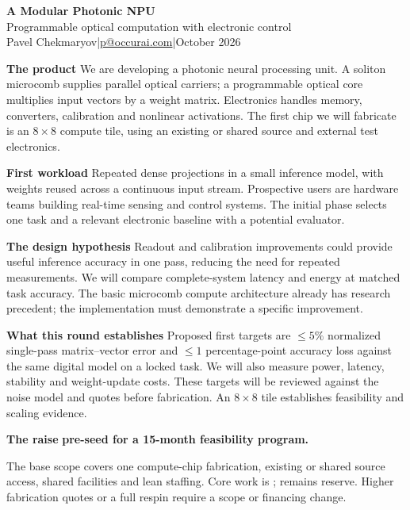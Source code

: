 \documentclass[10pt]{article}
\newcommand{\labelled}[1]{\textbf{\color{accent}#1}\quad}
\begin{document}
\raggedright
{\LARGE\bfseries\color{ink} A Modular Photonic NPU}\\[3pt]
{\large Programmable optical computation with electronic control}\\
Pavel Chekmaryov\quad|\quad\href{mailto:p@occurai.com}{p@occurai.com}\quad|\quad October 2026

\labelled{The product}
We are developing a photonic neural processing unit. A soliton microcomb supplies parallel optical carriers; a programmable optical core multiplies input vectors by a weight matrix. Electronics handles memory, converters, calibration and nonlinear activations. The first chip we will fabricate is an \(8\times8\) compute tile, using an existing or shared source and external test electronics.

\labelled{First workload}
Repeated dense projections in a small inference model, with weights reused across a continuous input stream. Prospective users are hardware teams building real-time sensing and control systems. The initial phase selects one task and a relevant electronic baseline with a potential evaluator.

\labelled{The design hypothesis}
Readout and calibration improvements could provide useful inference accuracy in one pass, reducing the need for repeated measurements. We will compare complete-system latency and energy at matched task accuracy. The basic microcomb compute architecture already has research precedent; the implementation must demonstrate a specific improvement.

\labelled{What this round establishes}
Proposed first targets are \(\leq5\%\) normalized single-pass matrix--vector error and \(\leq1\) percentage-point accuracy loss against the same digital model on a locked task. We will also measure power, latency, stability and weight-update costs. These targets will be reviewed against the noise model and quotes before fabrication. An \(8\times8\) tile establishes feasibility and scaling evidence.

\labelled{The raise}
\textbf{\FundingAsk{} pre-seed for a 15-month feasibility program.}
\begin{center}
\small

\end{center}
The base scope covers one compute-chip fabrication, existing or shared source access, shared facilities and lean staffing. Core work is \CoreBudget{}; \ReserveBudget{} remains reserve. Higher fabrication quotes or a full respin require a scope or financing change.
\end{document}
